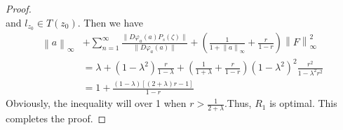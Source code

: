 \documentclass{birkjour}
\theoremstyle{plain}
\theoremstyle{definition}
\theoremstyle{definition}
\begin{document}
\begin{proof}
\begin{equation*}
	\end{equation*}
	and $l_{z_0}\in T(z_0)$. Then we have
	\begin{align*}
		\left \| a \right \| _\infty &+\sum_{n=1}^{\infty} \frac{\|D\varphi_a(a)P_s(\zeta)\|}{\|D\varphi_a(a)\|}+(\frac{1}{1+\left \| a \right \| _\infty} +\frac{r}{1-r} )\left \| F \right \|^2_\infty\\
		&=\lambda+(1-\lambda^2)\frac{r}{1-\lambda}+(\frac{1}{1+\lambda} +\frac{r}{1-r} )(1-\lambda^2)^2\frac{r^2}{1-\lambda^2r^2} \\
		&=1+\frac{(1-\lambda)[(2+\lambda)r-1]}{1-r}
	\end{align*}
	Obviously, the inequality will over 1 when $r > \frac{1}{2+\lambda} $.Thus, $R_1$ is optimal. This completes the proof.
\end{proof}
\end{document}

